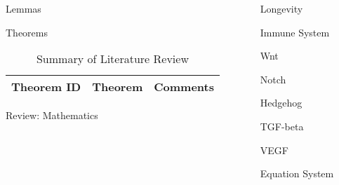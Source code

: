 \begin{frame}[t]
\begin{columns}[t]
\begin{column}{\onecolwid}
\begin{alertblock}{Lemmas}
\end{alertblock}
\begin{alertblock}{Theorems}

\begin{table}[H]
	\centering
	\begin{tabular}{r|p{12cm}|l}
	\hline
	Theorem ID  & Theorem & Comments \\
	\hline
	\hline
	\end{tabular}
	\caption{Summary of Literature Review}
\end{table} 

\end{alertblock}
\begin{alertblock}{Review: Mathematics}
\end{alertblock}
\end{column}
\begin{column}{\onecolwid} %

\begin{alertblock}{Longevity}

\begin{alertblock}{Immune System}\end{alertblock}
\begin{alertblock}{Wnt}\end{alertblock}
\begin{alertblock}{Notch}\end{alertblock}
\begin{alertblock}{Hedgehog}\end{alertblock}
\begin{alertblock}{TGF-beta}\end{alertblock}
\begin{alertblock}{VEGF}\end{alertblock}


\begin{alertblock}{Equation System}


\end{alertblock}
\end{alertblock}
\end{column}
\end{columns}
\end{frame}
